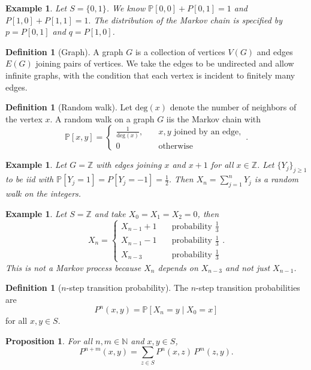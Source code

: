 \documentclass{tufte-handout}
\newcommand*\Z{\mathbb{Z}}
\renewcommand*\P{\mathbb{P}}
\newtheorem{ex}[thm]{Example}
\newtheorem{prop}[thm]{Proposition}
\theoremstyle{definition}
\newtheorem{defn}[thm]{Definition}
\begin{document}
\begin{ex}
	Let $S = \{0,1\}$. We know $\P[0,0] + P[0,1] = 1$ and $P[1,0] + P[1,1] = 1.$ The distribution of the Markov chain is specified by $p = P[0,1]$ and $q = P[1,0]$.
\end{ex}

\begin{defn}[Graph]
	A graph $G$ is a collection of vertices $V(G)$ and edges $E(G)$ joining pairs of vertices. We take the edges to be undirected and allow infinite graphs, with the condition that each vertex is incident to finitely many edges.
\end{defn}

\begin{defn}[Random walk]
	Let $\text{deg}(x)$ denote the number of neighbors of the vertex $x$. A random walk on a graph $G$ iis the Markov chain with \[
		\P[x,y] = \begin{cases}
			\frac{1}{\text{deg}(x)}, &\quad x,y \text{ joined by an edge}, \\
			0 &\quad \text{otherwise}
		\end{cases}
	.\] 
\end{defn}

\begin{ex}
	Let $G = \Z$ with edges joining $x$ and $x+1$ for all $x \in \Z$.
	Let $\{Y_j\}_{j \ge 1}$ to be iid with $\P\left[ Y_j = 1 \right] = P\left[ Y_j = -1 \right] = \frac{1}{2}$. Then $X_n = \sum\limits_{j=1}^{n} Y_j$ is a random walk on the integers.
\end{ex}

\begin{ex}
	Let $S=\Z$ and take $X_0=X_1=X_2 =0$, then \[
		X_n = \begin{cases}
			X_{n-1} + 1 &\quad \text{probability } \frac{1}{3} \\
			X_{n-1} - 1 &\quad \text{probability } \frac{1}{3} \\
			X_{n-3} &\quad \text{probability } \frac{1}{3}
		\end{cases}
	.\] 
	This is not a Markov process because $X_n$ depends on $X_{n-3}$ and not just $X_{n-1}$.
\end{ex}

\begin{defn}[$n$-step transition probability]
	The $n$-step transition probabilities are \[
		P^n(x,y) = \P\left[ X_n = y \mid X_0 = x \right] 
	\] for all $x,y \in S$.
\end{defn}

\begin{prop}
For all $n,m\in\mathbb{N}$ and $x,y\in S$,
\[
P^{n+m}(x,y)=\sum_{z\in S} P^{n}(x,z)\,P^{m}(z,y).
\]
\end{prop}
\end{document}
